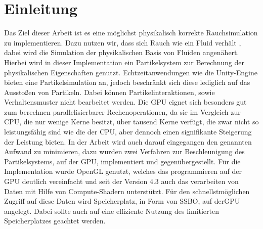 \documentclass[intern,palatino]{cgBA}
\begin{document}

\section{Einleitung}\label{einleitung}

Das Ziel dieser Arbeit ist es eine möglichst physikalisch korrekte Rauchsimulation zu implementieren. Dazu nutzen wir, dass sich Rauch wie ein Fluid verhält \cite{stam2003real}, dabei wird die Simulation der physikalischen Basis von Fluiden angenähert. Hierbei wird in dieser Implementation ein Partikelsystem zur Berechnung der physikalischen Eigenschaften genutzt. Echtzeitanwendungen wie die Unity-Engine bieten eine Partikelsimulation an, jedoch beschränkt sich diese lediglich auf das Ausstoßen von Partikeln. Dabei können Partikelinteraktionen, sowie Verhaltensmuster nicht bearbeitet werden.
\newline \newline
Die GPU eignet sich besonders gut zum berechnen parallelisierbarer Rechenoperationen, da sie im Vergleich zur CPU, die nur wenige Kerne besitzt, über tausend Kerne verfügt, die zwar nicht so leistungsfähig sind wie die der CPU, aber dennoch einen signifikante Steigerung der Leistung bieten.
\newline \newline
In der Arbeit wird auch darauf eingegangen den genannten Aufwand zu minimieren, dazu wurden zwei Verfahren zur Beschleunigung des Partikelsystems, auf der GPU,  implementiert und gegenübergestellt.
\newline \newline
Für die Implementation wurde OpenGL genutzt, welches das programmieren auf der GPU deutlich vereinfacht und seit der Version 4.3 auch das verarbeiten von Daten mit Hilfe von Compute-Shadern unterstützt. Für den schnellstmöglichen Zugriff auf diese Daten wird Speicherplatz, in Form von SSBO, auf derGPU angelegt. Dabei sollte auch auf eine effiziente Nutzung des limitierten Speicherplatzes geachtet werden.

\end{document}
